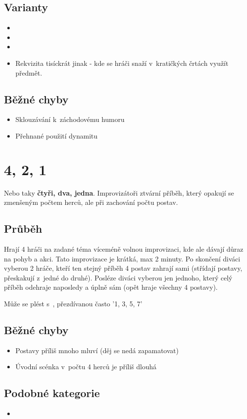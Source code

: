 \subsection{ Varianty } \begin{itemize}
\item  {}
\item  {}
\item  {}
\item  Rekvizita tisíckrát jinak - kde se hráči snaží v~kratičkých črtách využít předmět.
\end{itemize}
 
\subsection{ Běžné chyby } \begin{itemize}
\item Sklouzávání k~záchodovému humoru
\item Přehnané použití dynamitu
\end{itemize}
 
 
 
 
 
\needspace{5cm} \section{4, 2, 1} \label{4, 2, 1}  
 
 
Nebo taky \textbf{čtyři, dva, jedna}. Improvizátoři ztvární příběh, který opakují se zmenšeným počtem herců, ale při zachování počtu postav. 
 
 
\subsection{ Průběh }  
Hrají 4 hráči na zadané téma víceméně volnou improvizaci, kde ale dávají důraz na pohyb a akci. Tato improvizace je krátká, max 2 minuty. Po skončení diváci vyberou 2 hráče, kteří ten stejný příběh 4 postav zahrají sami (střídají postavy, přeskakují z~jedné do druhé). Posléze diváci vyberou jen jednoho, který celý příběh odehraje naposledy a úplně sám (opět hraje všechny 4 postavy). 
 
Může se plést s~, přezdívanou často '1, 3, 5, 7' 
 
\subsection{ Běžné chyby } \begin{itemize}
\item  Postavy příliš mnoho mluví (děj se nedá zapamatovat)
\item  Úvodní scénka v~počtu 4 herců je příliš dlouhá
\end{itemize}
 
\subsection{ Podobné kategorie }  
\begin{itemize}
\item  {}
\end{itemize}
 
 
 
